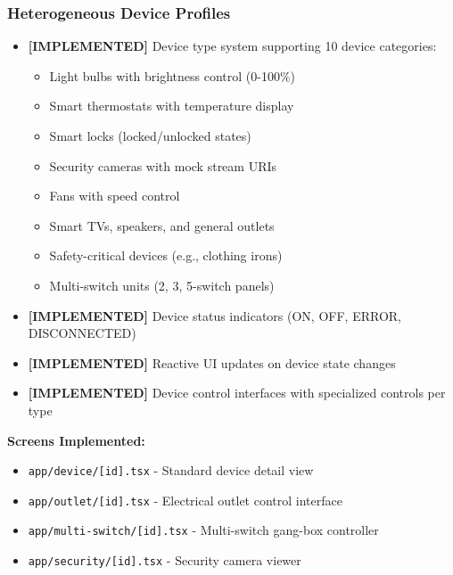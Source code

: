 \documentclass[12pt,a4paper]{article}
\begin{document}
\subsubsection{Heterogeneous Device Profiles}
\begin{itemize}[leftmargin=*]
    \item \textcolor{implemented}{\textbf{[IMPLEMENTED]}} Device type system supporting 10 device categories:
    \begin{itemize}
        \item Light bulbs with brightness control (0-100\%)
        \item Smart thermostats with temperature display
        \item Smart locks (locked/unlocked states)
        \item Security cameras with mock stream URIs
        \item Fans with speed control
        \item Smart TVs, speakers, and general outlets
        \item Safety-critical devices (e.g., clothing irons)
        \item Multi-switch units (2, 3, 5-switch panels)
    \end{itemize}
    \item \textcolor{implemented}{\textbf{[IMPLEMENTED]}} Device status indicators (ON, OFF, ERROR, DISCONNECTED)
    \item \textcolor{implemented}{\textbf{[IMPLEMENTED]}} Reactive UI updates on device state changes
    \item \textcolor{implemented}{\textbf{[IMPLEMENTED]}} Device control interfaces with specialized controls per type
\end{itemize}


\textbf{Screens Implemented:}
\begin{itemize}
    \item \texttt{app/device/[id].tsx} - Standard device detail view
    \item \texttt{app/outlet/[id].tsx} - Electrical outlet control interface
    \item \texttt{app/multi-switch/[id].tsx} - Multi-switch gang-box controller
    \item \texttt{app/security/[id].tsx} - Security camera viewer
\end{itemize}
\end{document}
